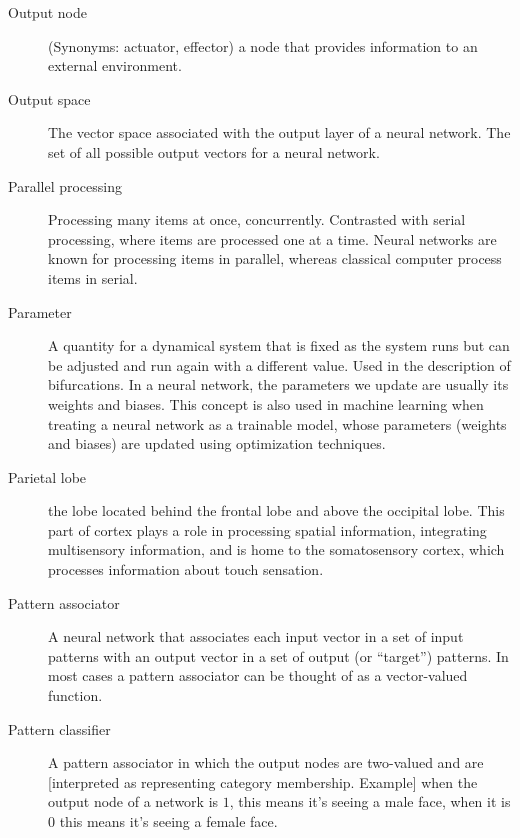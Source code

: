\begin{description}
\item[Output node] (Synonyms: actuator, effector) a node that provides information to an external environment. 

\item[Output space] The vector space associated with the output layer of a neural network. The set of all possible output vectors for a neural network.

\item[Parallel processing] Processing many items at once, concurrently. Contrasted with serial processing, where items are processed one at a time.  Neural networks are known for processing items in parallel, whereas classical computer process items in serial.

\item[Parameter] A quantity for a dynamical system that is fixed as the system runs but can be adjusted and run again with a different value. Used in the description of bifurcations. In a neural network, the parameters we  update are usually its weights and biases. This concept is also used in machine learning when treating a neural network as a trainable model, whose parameters (weights and biases) are updated using optimization techniques.

\item[Parietal lobe] the lobe located behind the frontal lobe and above the occipital lobe. This part of cortex plays a role in processing spatial information, integrating multisensory information, and is home to the somatosensory cortex, which processes information about touch sensation.

\item[Pattern associator] A neural network that associates each input vector in a set of input patterns with an output vector in a set of output (or ``target'') patterns. In most cases a pattern associator can be thought of as a vector-valued function. 
	

\item[Pattern classifier] A pattern associator in which the output nodes are two-valued and are [interpreted as representing category membership. Example] when the output node of a network is $1$, this means it's seeing a male face, when it is $0$ this means it's seeing a female face.



\end{description}
